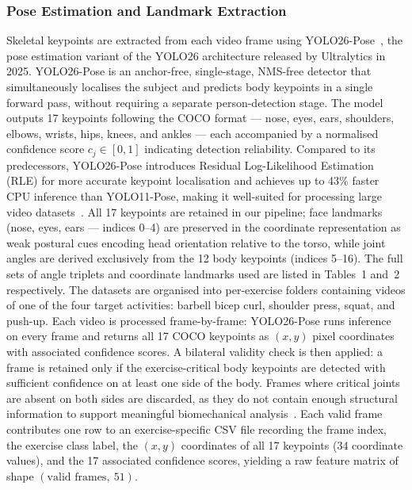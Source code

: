 \documentclass[conference,onecolumn,oneside]{IEEEtran}
\begin{document}
\subsubsection{Pose Estimation and Landmark Extraction}
\vspace{0.5cm}
Skeletal keypoints are extracted from each video frame using
YOLO26-Pose~\cite{26}, the pose estimation variant of the YOLO26
architecture released by Ultralytics in 2025. YOLO26-Pose is an anchor-free,
single-stage, NMS-free detector that simultaneously localises the subject
and predicts body keypoints in a single forward pass, without requiring a
separate person-detection stage. The model outputs 17 keypoints
following the COCO format --- nose, eyes, ears, shoulders, elbows, wrists,
hips, knees, and ankles --- each accompanied by a normalised confidence
score $c_j \in [0, 1]$ indicating detection reliability. Compared to its
predecessors, YOLO26-Pose introduces Residual Log-Likelihood Estimation
(RLE) for more accurate keypoint localisation and achieves up to 43\%
faster CPU inference than YOLO11-Pose, making it well-suited for
processing large video datasets~\cite{26}. All 17 keypoints are retained
in our pipeline; face landmarks (nose, eyes, ears --- indices 0--4) are
preserved in the coordinate representation as weak postural cues encoding
head orientation relative to the torso, while joint angles are derived
exclusively from the 12 body keypoints (indices 5--16). The full sets of
angle triplets and coordinate landmarks used are listed in Tables~1
and~2 respectively.
The datasets are organised into per-exercise folders containing videos of
one of the four target activities: barbell bicep curl, shoulder press,
squat, and push-up. Each video is processed frame-by-frame: YOLO26-Pose
runs inference on every frame and returns all 17 COCO keypoints as
$(x, y)$ pixel coordinates with associated confidence scores. A bilateral
validity check is then applied: a frame is retained only if the
exercise-critical body keypoints are detected with sufficient confidence on
at least one side of the body. Frames where critical joints are absent on
both sides are discarded, as they do not contain enough structural
information to support meaningful biomechanical analysis~\cite{1}. Each valid frame contributes one row to an exercise-specific CSV file
recording the frame index, the exercise class label, the $(x, y)$
coordinates of all 17 keypoints (34 coordinate values), and the 17
associated confidence scores, yielding a raw feature matrix of shape
$(\text{valid frames},\ 51)$.
\end{document}
